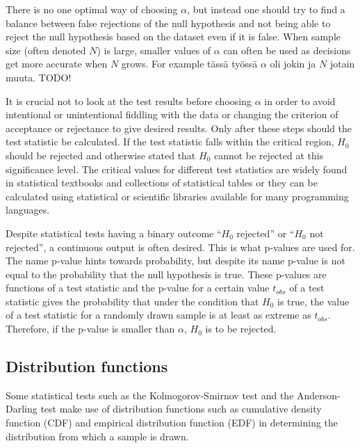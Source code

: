 \documentclass[english, oneside]{HYgradu}
\begin{document}
There is no one optimal way of choosing $\alpha$, but instead one should try to find a balance between false rejections of the null hypothesis and not being able to reject the null hypothesis based on the dataset even if it is false. When sample size (often denoted $N$) is large, smaller values of $\alpha$ can often be used as decisions get more accurate when $N$ grows. For example tässä työssä $\alpha$ oli jokin ja $N$ jotain muuta. TODO! %

It is crucial not to look at the test results before choosing $\alpha$ in order to avoid intentional or unintentional fiddling with the data or changing the criterion of acceptance or rejectance to give desired results. Only after these steps should the test statistic be calculated. If the test statistic falls within the critical region, $H_0$ should be rejected and otherwise stated that $H_0$ cannot be rejected at this significance level. The critical values for different test statistics are widely found in statistical textbooks and collections of statistical tables or they can be calculated using statistical or scientific libraries available for many programming languages.

Despite statistical tests having a binary outcome ``$H_0$ rejected'' or ``$H_0$ not rejected'', a continuous output is often desired. This is what p-values are used for. The name p-value hints towards probability, but despite its name p-value is not equal to the probability that the null hypothesis is true. These p-values are functions of a test statistic and the p-value for a certain value $t_{obs}$ of a test statistic gives the probability that under the condition that $H_0$ is true, the value of a test statistic for a randomly drawn sample is at least as extreme as $t_{obs}$. Therefore, if the p-value is smaller than $\alpha$, $H_0$ is to be rejected.

\subsection{Distribution functions} \label{sect:distribution-functions}
Some statistical tests such as the Kolmogorov-Smirnov test and the Anderson-Darling test make use of distribution functions such as cumulative density function (CDF) and empirical distribution function (EDF) in determining the distribution from which a sample is drawn. %
\end{document}
